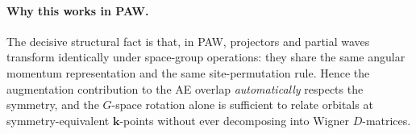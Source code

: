 \documentclass[11pt,a4paper]{article}
\newcommand{\kk}{\mathbf{k}}
\begin{document}
\paragraph{Why this works in PAW.} The decisive structural fact is that, in
PAW, projectors and partial waves transform identically under space-group
operations: they share the same angular momentum representation and the same
site-permutation rule. Hence the augmentation contribution to the AE overlap
\emph{automatically} respects the symmetry, and the $G$-space rotation alone
is sufficient to relate orbitals at symmetry-equivalent $\kk$-points without
ever decomposing into Wigner $D$-matrices.
\end{document}
